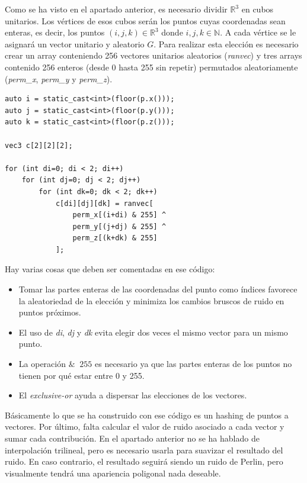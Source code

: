 \documentclass[12pt]{article}
\theoremstyle{definition}
\theoremstyle{remark}
\begin{document}
Como se ha visto en el apartado anterior, es necesario dividir $\mathbb{R}^3$ en cubos unitarios. Los vértices de esos cubos serán los puntos cuyas coordenadas sean enteras, es decir, los puntos $(i,j,k)\in\mathbb{R}^3$ donde $i,j,k\in\mathbb{N}$. A cada vértice se le asignará un vector unitario y aleatorio $G$. Para realizar esta elección es necesario crear un array conteniendo 256 vectores unitarios aleatorios (\textit{ranvec}) y tres arrays contenido 256 enteros (desde 0 hasta 255 sin repetir) permutados aleatoriamente  (\textit{perm\_x}, \textit{perm\_y} y \textit{perm\_z}).

\begin{lstlisting}[]
auto i = static_cast<int>(floor(p.x()));
auto j = static_cast<int>(floor(p.y()));
auto k = static_cast<int>(floor(p.z()));

vec3 c[2][2][2];

for (int di=0; di < 2; di++)
    for (int dj=0; dj < 2; dj++)
        for (int dk=0; dk < 2; dk++)
            c[di][dj][dk] = ranvec[
                perm_x[(i+di) & 255] ^
                perm_y[(j+dj) & 255] ^
                perm_z[(k+dk) & 255]
            ];
\end{lstlisting}

Hay varias cosas que deben ser comentadas en ese código:
\begin{itemize}
\item Tomar las partes enteras de las coordenadas del punto como índices favorece la aleatoriedad de la elección y minimiza los cambios bruscos de ruido en puntos próximos.
\item El uso de \textit{di}, \textit{dj} y \textit{dk} evita elegir dos veces el mismo vector para un mismo punto.
\item La operación $\& \;\; 255$ es necesario ya que las partes enteras de los puntos no tienen por qué estar entre 0 y 255.
\item El \textit{exclusive-or} ayuda a dispersar las elecciones de los vectores.
\end{itemize}

Básicamente lo que se ha construido con ese código es un hashing de puntos a vectores. Por último, falta calcular el valor de ruido asociado a cada vector y sumar cada contribución. En el apartado anterior no se ha hablado de interpolación trilineal, pero es necesario usarla para suavizar el resultado del ruido. En caso contrario, el resultado seguirá siendo un ruido de Perlin, pero visualmente tendrá una apariencia poligonal nada deseable.
\end{document}
